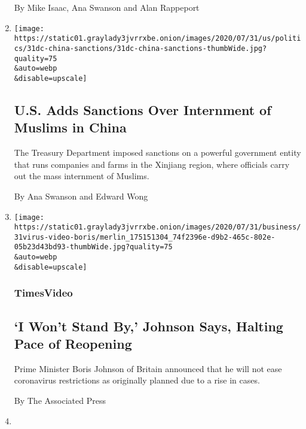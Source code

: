 \begin{enumerate}
  By Mike Isaac, Ana Swanson and Alan Rappeport
\item
  \href{/2020/07/31/us/politics/sanctions-china-xinjiang-uighurs.html}{}

  \texttt{[image: https://static01.graylady3jvrrxbe.onion/images/2020/07/31/us/politics/31dc-china-sanctions/31dc-china-sanctions-thumbWide.jpg?quality=75\\\&auto=webp\\\&disable=upscale]}

  \hypertarget{us-adds-sanctions-over-internment-of-muslims-in-china}{%
  \subsection{U.S. Adds Sanctions Over Internment of Muslims in
  China}\label{us-adds-sanctions-over-internment-of-muslims-in-china}}

  The Treasury Department imposed sanctions on a powerful government
  entity that runs companies and farms in the Xinjiang region, where
  officials carry out the mass internment of Muslims.

  By Ana Swanson and Edward Wong
\item
  \href{/video/us/politics/100000007266983/johnson-coronavirus-restrictions.html}{}

  \texttt{[image: https://static01.graylady3jvrrxbe.onion/images/2020/07/31/business/31virus-video-boris/merlin\_175151304\_74f2396e-d9b2-465c-802e-05b23d43bd93-thumbWide.jpg?quality=75\\\&auto=webp\\\&disable=upscale]}

  \hypertarget{timesvideo}{%
  \subsubsection{TimesVideo}\label{timesvideo}}

  \hypertarget{i-wont-stand-by-johnson-says-halting-pace-of-reopening}{%
  \subsection{`I Won't Stand By,' Johnson Says, Halting Pace of
  Reopening}\label{i-wont-stand-by-johnson-says-halting-pace-of-reopening}}

  Prime Minister Boris Johnson of Britain announced that he will not
  ease coronavirus restrictions as originally planned due to a rise in
  cases.

  By The Associated Press
\item
  \href{/2020/07/31/style/19th-amendment-native-womens-suffrage.html}{}


\end{enumerate}

